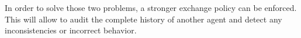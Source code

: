 In order to solve those two problems, a stronger exchange policy can be enforced. This will allow 
to audit the complete history of another agent and detect any inconsistencies or incorrect behavior.






